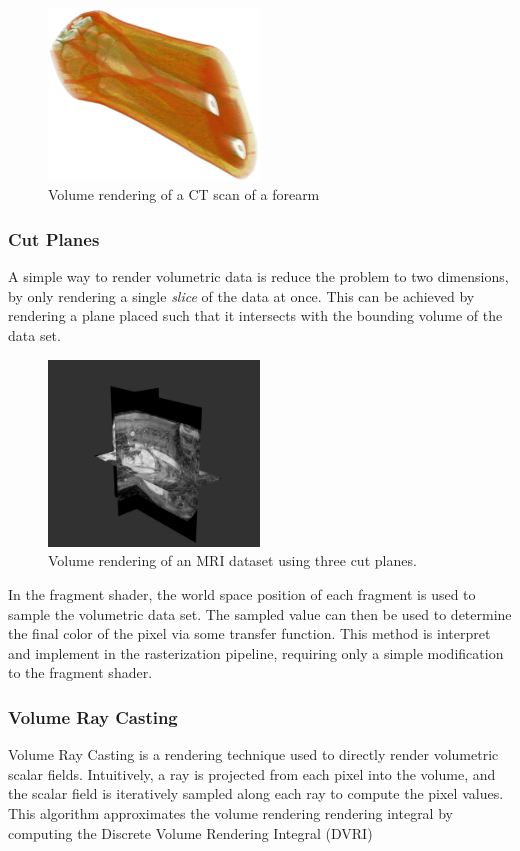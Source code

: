 \documentclass{article}
\begin{document}
\begin{figure}[tbh]
    \centering
    \includegraphics[width=0.5\textwidth]{images/VolumeRendering.png}
    \caption{Volume rendering of a CT scan of a forearm}
    \label{fig:forearmCT}
\end{figure}

\subsubsection{Cut Planes}
A simple way to render volumetric data is reduce the problem to two dimensions, by only rendering a single \textit{slice} of the data
at once. This can be achieved by rendering a plane placed such that it intersects with the bounding volume of the 
data set. 
\begin{figure}[tbh!]
    \centering
    \includegraphics[width=0.5\textwidth]{images/CutPlanes.png}
    \caption{Volume rendering of an MRI dataset using three cut planes.}
    \label{fig:cutPlanes}
\end{figure}
In the fragment shader, the world space position of each fragment is used to sample the volumetric data set. The sampled value can then be used to determine the final color of the pixel via some transfer function.
This method is interpret and implement in the rasterization pipeline, requiring only a simple modification to the fragment shader. 

\subsubsection{Volume Ray Casting}
Volume Ray Casting is a rendering technique used to directly render volumetric scalar fields.
Intuitively, a ray is projected from each pixel into the volume,
and the scalar field is iteratively sampled along each ray to compute the pixel values.
This algorithm approximates the volume rendering rendering integral by computing the Discrete Volume Rendering Integral (DVRI) 
\end{document}
